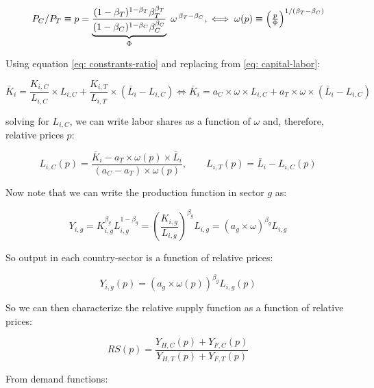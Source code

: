 \documentclass[11pt,letterpaper]{article}
\begin{document}
\begin{equation*}
    P_C/P_T \equiv p
   =\underbrace{\frac{(1-\beta_T)^{1-\beta_T}\beta_T^{\beta_T}}
                      {(1-\beta_C)^{1-\beta_C}\beta_C^{\beta_C}}}_{\Phi}
      \;\omega^{\,\beta_T-\beta_C},
\iff
\omega(p) \equiv \Bigl(\tfrac{p}{\Phi}\Bigr)^{1/(\beta_T-\beta_C)}
\end{equation*}

Using equation \eqref{eq: constrants-ratio} and replacing from \eqref{eq: capital-labor}:

\begin{equation*}
   \bar{K}_i = \frac{K_{i,C}}{L_{i,C}} \times L_{i,C} + \frac{K_{i,T}}{L_{i,T}} \times (\bar{L}_i-L_{i,C}) \iff  \bar{K}_i  = a_C\times \omega  \times L_{i,C} + a_T \times \omega \times (\bar{L}_i-L_{i,C})
\end{equation*}

\noindent solving for $L_{i,C}$, we can write labor shares as a function of $\omega$ and, therefore, relative prices $p$:

\begin{equation*}\label{eq: lc}
    L_{i,C}(p) = \frac{\bar{K}_i - a_T \times \omega(p) \times \bar{L}_i}{(a_C- a_T) \times \omega(p)}, \qquad L_{i,T}(p) = \bar{L}_i - L_{i,C}(p)
\end{equation*}

Now note that we can write the production function in sector $g$ as:

\begin{equation*}
    Y_{i,g} = K_{i,g}^{\beta_g} L_{i,g}^{1-\beta_g} = \left(\frac{K_{i,g}}{L_{i,g}}\right)^{\beta_g} L_{i,g} =  \left(a_g \times \omega\right)^{\beta_g} L_{i,g} 
\end{equation*}

So output in each country-sector is a function of relative prices:

\begin{equation*}
    Y_{i,g}(p) =  \left(a_g \times \omega(p) \right)^{\beta_g} L_{i,g}(p) 
\end{equation*}

So we can then characterize the relative supply function as a function of relative prices:

\begin{equation*}
    RS(p) = \frac{Y_{H,C}\left(p\right) + Y_{F,C}\left(p\right)}{Y_{H,T}\left(p\right) + Y_{F,T}\left(p\right)}
\end{equation*}

From demand functions:
\end{document}
